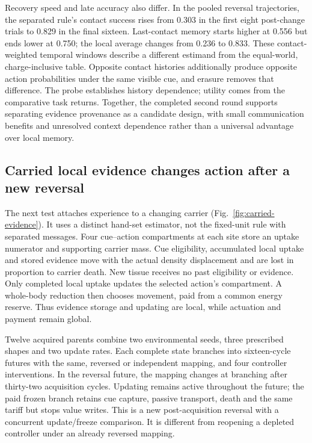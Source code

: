 Recovery speed and late accuracy also differ. In the pooled reversal trajectories, the separated rule's contact success rises from 0.303 in the first eight post-change trials to 0.829 in the final sixteen. Last-contact memory starts higher at 0.556 but ends lower at 0.750; the local average changes from 0.236 to 0.833. These contact-weighted temporal windows describe a different estimand from the equal-world, charge-inclusive table. Opposite contact histories additionally produce opposite action probabilities under the same visible cue, and erasure removes that difference. The probe establishes history dependence; utility comes from the comparative task returns. Together, the completed second round supports separating evidence provenance as a candidate design, with small communication benefits and unresolved context dependence rather than a universal advantage over local memory.

\subsection*{Carried local evidence changes action after a new reversal}
The next test attaches experience to a changing carrier (Fig.~\ref{fig:carried-evidence}). It uses a distinct hand-set estimator, not the fixed-unit rule with separated messages. Four cue--action compartments at each site store an uptake numerator and supporting carrier mass. Cue eligibility, accumulated local uptake and stored evidence move with the actual density displacement and are lost in proportion to carrier death. New tissue receives no past eligibility or evidence. Only completed local uptake updates the selected action's compartment. A whole-body reduction then chooses movement, paid from a common energy reserve. Thus evidence storage and updating are local, while actuation and payment remain global.

Twelve acquired parents combine two environmental seeds, three prescribed shapes and two update rates. Each complete state branches into sixteen-cycle futures with the same, reversed or independent mapping, and four controller interventions. In the reversal future, the mapping changes at branching after thirty-two acquisition cycles. Updating remains active throughout the future; the paid frozen branch retains cue capture, passive transport, death and the same tariff but stops value writes. This is a new post-acquisition reversal with a concurrent update/freeze comparison. It is different from reopening a depleted controller under an already reversed mapping.

